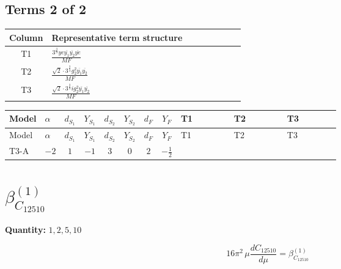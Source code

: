 \documentclass[8pt]{article}
\begin{document}
\begin{landscape}
\subsection*{Terms 2 of 2}
\begin{center}
\begin{tabular}{@{}c >{\raggedright\arraybackslash}p{0.82\linewidth}@{}}
\toprule
Column & Representative term structure \\
\midrule
T1 & \(\displaystyle \frac{3^{\frac{3}{4}} ye \overline{y_{1}} \overline{y_{2}} \overline{ye}}{MF}\) \\
\midrule
T2 & \(\displaystyle \frac{\sqrt{2} \cdot 3^{\frac{3}{4}} g_{2}^{2} \overline{y_{1}} \overline{y_{2}}}{MF}\) \\
\midrule
T3 & \(\displaystyle \frac{\sqrt{2} \cdot 3^{\frac{3}{4}} i g_{2}^{2} \overline{y_{1}} \overline{y_{2}}}{MF}\) \\
\midrule
\bottomrule
\end{tabular}
\end{center}
\smallskip
\tiny
\begin{longtable}{@{}llcccccc >{\raggedright\arraybackslash}p{0.21\linewidth} >{\raggedright\arraybackslash}p{0.21\linewidth} >{\raggedright\arraybackslash}p{0.21\linewidth}@{}}
\toprule
Model & $\alpha$ & $d_{S_1}$ & $Y_{S_1}$ & $d_{S_2}$ & $Y_{S_2}$ & $d_F$ & $Y_F$ & T1 & T2 & T3 \\
\midrule
\endfirsthead
\toprule
Model & $\alpha$ & $d_{S_1}$ & $Y_{S_1}$ & $d_{S_2}$ & $Y_{S_2}$ & $d_F$ & $Y_F$ & T1 & T2 & T3 \\
\midrule
\endhead
T3-A & $-2$ & $1$ & $-1$ & $3$ & $0$ & $2$ & $-\frac{1}{2}$ & \scriptsize\adjustbox{max width=\linewidth}{$\begin{gathered} - \frac{3^{\frac{3}{4}} ye \overline{y_{1}} \overline{y_{2}} \overline{ye}}{12 MF}\end{gathered}$} & \scriptsize\adjustbox{max width=\linewidth}{$\begin{gathered} \frac{\sqrt{2} \cdot 3^{\frac{3}{4}} g_{2}^{2} \overline{y_{1}} \overline{y_{2}}}{6 MF}\end{gathered}$} & \scriptsize\adjustbox{max width=\linewidth}{$\begin{gathered} - \frac{\sqrt{2} \cdot 3^{\frac{3}{4}} i g_{2}^{2} \overline{y_{1}} \overline{y_{2}}}{6 MF}\end{gathered}$} \\
\midrule
\bottomrule
\end{longtable}
\clearpage
\section*{$\beta_{C_{12510}}^{(1)}$}
\noindent\textbf{Quantity: }$\mathrm{1,2,5,10}$\par\smallskip
\[16\pi^2\,\mu\frac{d C_{12510}}{d\mu}=\beta_{C_{12510}}^{(1)}\]

\end{landscape}
\end{document}

